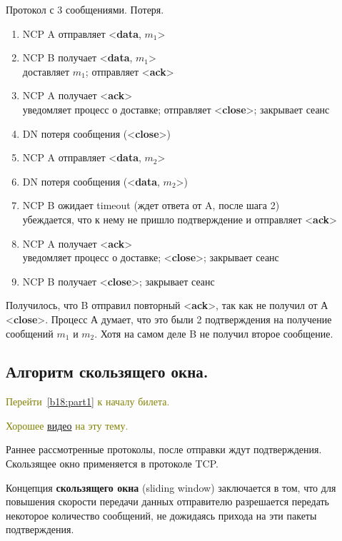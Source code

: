 \begin{algorithm}[h!]
	\caption{Протокол с 3 сообщениями. Потеря.}
	\begin{enumerate}
		\item NCP A отправляет <\textbf{data}, $m_1$>
		\item NCP B получает <\textbf{data}, $m_1$> \\
			доставляет $m_1$; отправляет <\textbf{ack}>
		\item NCP A получает <\textbf{ack}> \\
			уведомляет процесс о доставке; отправляет <\textbf{close}>; закрывает сеанс
		\item DN потеря сообщения (<\textbf{close}>)
		\item NCP A отправляет <\textbf{data}, $m_2$>
		\item DN потеря сообщения (<\textbf{data}, $m_2$>)
		\item NCP B ожидает timeout (ждет ответа от A, после шага 2) \\
			убеждается, что к нему не пришло подтверждение  и отправляет <\textbf{ack}>
		\item NCP A получает <\textbf{ack}> \\
			уведомляет процесс о доставке; <\textbf{close}>; закрывает сеанс
		\item NCP B получает <\textbf{close}>; закрывает сеанс
	\end{enumerate}
\end{algorithm}


Получилось, что B отправил повторный <\textbf{ack}>, так как не получил от А  <\textbf{close}>. Процесс А думает, что это были 2 подтверждения на получение сообщений $m_1$ и $m_2$. Хотя на самом деле B не получил второе сообщение.

\subsection*{Алгоритм скользящего окна.}\label{b18:part2}

\textcolor{olive}{Перейти~\ref{b18:part1} к началу билета.}

\textcolor{olive}{Хорошее \href{https://www.youtube.com/watch?v=hd6QNXK5rPk}{видео} на эту тему.}

Раннее рассмотренные протоколы, после отправки ждут подтверждения. Скользящее окно применяется в протоколе TCP.

Концепция \textbf{скользящего окна} (sliding window) заключается в том, что для повышения скорости передачи данных отправителю разрешается передать некоторое количество сообщений, не дожидаясь прихода на эти пакеты подтверждения.

